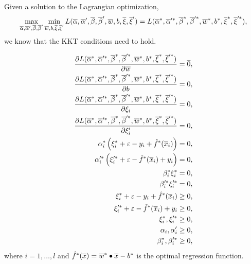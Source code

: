 \documentclass[a4paper,blends,pdf,colorBG,slideColor]{prosper}
\begin{document}
\vspace{.2in}
Given a solution to the Lagrangian optimization,
\begin{equation*}
\max_{\overline{\alpha},\overline{\alpha}',\overline{\beta},\overline{\beta}'}
\min_{\overline{w},b,\overline{\xi},\overline{\xi}'} L(\overline{\alpha},\overline{\alpha}',\overline{\beta},\overline{\beta}',\overline{w},b,\overline{\xi},\overline{\xi}') =
L(\overline{\alpha}^*,\overline{\alpha}'^*,\overline{\beta}^*,\overline{\beta}'^*,\overline{w}^*,b^*,\overline{\xi}^*,\overline{\xi}'^*),
\end{equation*}
we know that  the KKT conditions need to hold.
\es

\tiny\begin{align*}
\frac{\partial L(\overline{\alpha}^*,\overline{\alpha}'^*,\overline{\beta}^*,\overline{\beta}'^*,\overline{w}^*,b^*,\overline{\xi}^*,\overline{\xi}'^*)}{\partial \overline{w}}  &=  \overline{0},\\
\frac{\partial L(\overline{\alpha}^*,\overline{\alpha}'^*,\overline{\beta}^*,\overline{\beta}'^*,\overline{w}^*,b^*,\overline{\xi}^*,\overline{\xi}'^*)}{\partial b}  &=  0,\\
\frac{\partial L(\overline{\alpha}^*,\overline{\alpha}'^*,\overline{\beta}^*,\overline{\beta}'^*,\overline{w}^*,b^*,\overline{\xi}^*,\overline{\xi}'^*)}{\partial \xi_i}  &=  0,\\
\frac{\partial L(\overline{\alpha}^*,\overline{\alpha}'^*,\overline{\beta}^*,\overline{\beta}'^*,\overline{w}^*,b^*,\overline{\xi}^*,\overline{\xi}'^*)}{\partial \xi_i'}  &=  0,\\
\alpha_i^* \left(\xi_i^* + \varepsilon- y_i + \hat{f}^*(\overline{x}_i)\right) &= 0,\\
\alpha_i'^* \left(\xi_i'^* + \varepsilon - \hat{f}^*(\overline{x}_i)  + y_i \right) &= 0, \\
\beta_i^*\xi_i^* &= 0, \\
\beta_i'^*\xi_i'^* &= 0,\\
\xi_i^* + \varepsilon- y_i + \hat{f}^*(\overline{x}_i) &\geq 0,\\
\xi_i'^* + \varepsilon - \hat{f}^*(\overline{x}_i)  + y_i  &\geq 0, \\
\xi_i^*,\xi_i'^* &\geq 0, \\
\alpha_i,\alpha_i'&\geq 0,\\
\beta_i^*,\beta_i'^* &\geq 0,
\end{align*}
where $i = 1,\ldots,l$ and $\hat{f}^*(\overline{x}) = \overline{w}^*\bullet\overline{x} - b^*$ is
the optimal regression function.

\es


\scriptsize
\end{document}
